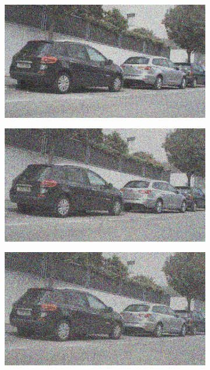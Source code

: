 \documentclass[a4paper]{ctexart}
\begin{document}
\begin{figure}[htbp]
\begin{subfigure}{0.08\textwidth}
				\label{fig：Gamma=0.8, Gauss Noise = 0.4}
			\end{subfigure}
			\begin{subfigure}{0.08\textwidth}
				\captionsetup{font=scriptsize}
				\includegraphics[width=\linewidth]{picture/Edge Detection/degrade/RGB_001 Gamma=0.8, Gauss Noise=0.5}
				\label{fig：Gamma=0.8, Gauss Noise = 0.5}
			\end{subfigure}
			\begin{subfigure}{0.08\textwidth}
				\captionsetup{font=scriptsize}
				\includegraphics[width=\linewidth]{picture/Edge Detection/degrade/RGB_001 Gamma=0.8, Gauss Noise=0.6}
				\label{fig：Gamma=0.8, Gauss Noise = 0.6}
			\end{subfigure}
			\begin{subfigure}{0.08\textwidth}
				\captionsetup{font=scriptsize}
				\includegraphics[width=\linewidth]{picture/Edge Detection/degrade/RGB_001 Gamma=0.8, Gauss Noise=0.7}

\end{subfigure}
\end{figure}
\end{document}
